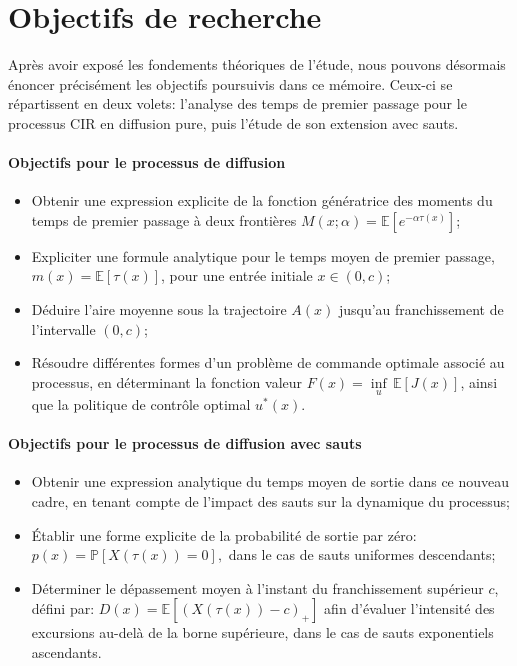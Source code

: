 \section{Objectifs de recherche}  %

Après avoir exposé les fondements théoriques de l'étude, nous pouvons désormais énoncer précisément les objectifs poursuivis dans ce mémoire. Ceux-ci se répartissent en deux volets: l'analyse des temps de premier passage pour le processus \acs{CIR} en diffusion pure, puis l'étude de son extension avec sauts.
\paragraph{Objectifs pour le processus de diffusion}
\begin{itemize}
    \item Obtenir une expression explicite de la fonction génératrice des moments du temps de premier passage à deux frontières \( M(x;\alpha) = \mathds{E}[e^{-\alpha \tau(x)}] \);
    \item Expliciter une formule analytique pour le temps moyen de premier passage, \( m(x) = \mathds{E}[\tau(x)] \), pour une entrée initiale \( x \in (0,c) \);
    \item Déduire l'aire moyenne sous la trajectoire $A(x)$ jusqu'au franchissement de l'intervalle \( (0,c) \);
    \item Résoudre différentes formes d'un problème de commande optimale associé au processus, en déterminant la fonction valeur \( F(x) = \underset{u}{\inf}\,\mathds{E}[J(x)] \), ainsi que la politique de contrôle optimal $u^*(x)$.
\end{itemize}
\paragraph{Objectifs pour le processus de diffusion avec sauts}
\begin{itemize}
    \item Obtenir une expression analytique du temps moyen de sortie dans ce nouveau cadre, en tenant compte de l'impact des sauts sur la dynamique du processus;
    \item Établir une forme explicite de la probabilité de sortie par zéro:
    \(
    p(x) = \mathds{P}[X(\tau(x)) = 0],
    \)
    dans le cas de sauts uniformes descendants;
    \item Déterminer le dépassement moyen à l'instant du franchissement supérieur \( c \), défini par:
    \(
    D(x) = \mathds{E}[(X(\tau(x)) - c)_+]
    \)
    afin d'évaluer l'intensité des excursions au-delà de la borne supérieure, dans le cas de sauts exponentiels ascendants.
\end{itemize}


